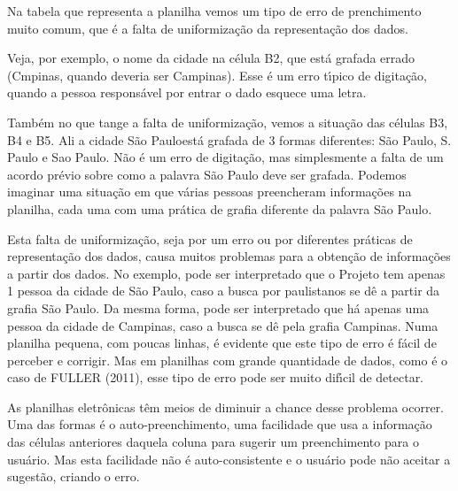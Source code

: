 \documentclass[
12pt,		%
openright,	%
twoside,  %
a4paper,			%
chapter=TITLE,		%
english,			%
french,				%
spanish,			%
brazil				%
]{USPSC-classe/USPSC}
\begin{document}
Na tabela que representa a planilha vemos um tipo de erro de prenchimento muito comum, que \'e a falta de uniformiza\c{c}\~ao da representa\c{c}\~ao dos dados.










Veja, por exemplo, o nome da cidade na c\'elula B2, que est\'a grafada errado (Cmpinas, quando deveria ser Campinas). Esse \'e um erro t\'{\i}pico de digita\c{c}\~ao, quando a pessoa respons\'avel por entrar o dado esquece uma letra.










Tamb\'em no que tange a falta de uniformiza\c{c}\~ao, vemos a situa\c{c}\~ao das c\'elulas B3, B4 e B5. Ali a cidade \textquotedbl S\~ao Paulo\textquotedbl  est\'a grafada de 3 formas diferentes: S\~ao Paulo, S. Paulo e Sao Paulo. N\~ao \'e um erro de digita\c{c}\~ao, mas simplesmente a falta de um acordo pr\'evio sobre como a palavra S\~ao Paulo deve ser grafada. Podemos imaginar uma situa\c{c}\~ao em que v\'arias pessoas preencheram informa\c{c}\~oes na planilha, cada uma com uma pr\'atica de grafia diferente da palavra S\~ao Paulo.










Esta falta de uniformiza\c{c}\~ao, seja por um erro ou por diferentes pr\'aticas de representa\c{c}\~ao dos dados, causa muitos problemas para a obten\c{c}\~ao de informa\c{c}\~oes a partir dos dados. No exemplo, pode ser interpretado que o Projeto tem apenas 1 pessoa da cidade de S\~ao Paulo, caso a busca por paulistanos se d\^e a partir da grafia \textquotedbl S\~ao Paulo\textquotedbl . Da mesma forma, pode ser interpretado que h\'a apenas uma pessoa da cidade de Campinas, caso a busca se d\^e pela grafia \textquotedbl Campinas\textquotedbl . Numa planilha pequena, com poucas linhas, \'e evidente que este tipo de erro \'e f\'acil de perceber e corrigir. Mas em planilhas com grande quantidade de dados, como \'e o caso de  FULLER (2011), esse tipo de erro pode ser muito dif\'{\i}cil de detectar.










As planilhas eletr\^onicas t\^em meios de diminuir a chance desse problema ocorrer. Uma das formas \'e o auto-preenchimento, uma facilidade que usa a informa\c{c}\~ao das c\'elulas anteriores daquela coluna para sugerir um preenchimento para o usu\'ario. Mas esta facilidade n\~ao \'e auto-consistente e o usu\'ario pode n\~ao aceitar a sugest\~ao, criando o erro.
\end{document}
